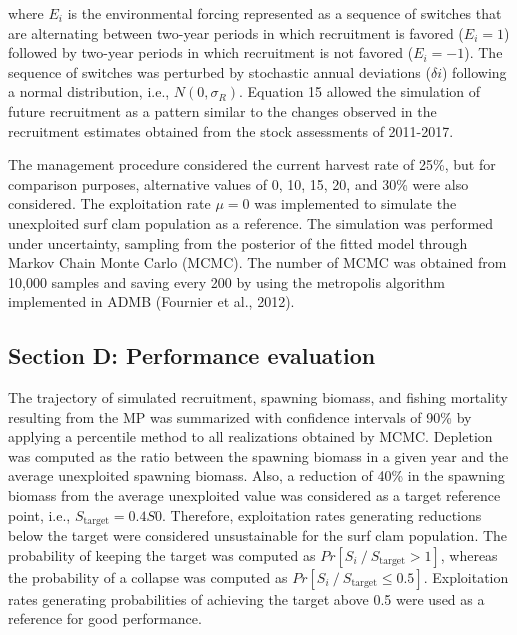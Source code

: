 \documentclass[12pt]{article}
\begin{document}
where \(E_i\) is the environmental forcing represented as a sequence of
switches that are alternating between two-year periods in which
recruitment is favored (\(E_i = 1\)) followed by two-year periods in
which recruitment is not favored (\(E_i = -1\)). The sequence of
switches was perturbed by stochastic annual deviations (\(\delta i\))
following a normal distribution, i.e., \(N(0,\sigma_R)\). Equation 15
allowed the simulation of future recruitment as a pattern similar to the
changes observed in the recruitment estimates obtained from the stock
assessments of 2011-2017.

The management procedure considered the current harvest rate of 25\%,
but for comparison purposes, alternative values of 0, 10, 15, 20, and
30\% were also considered. The exploitation rate \(\mu=0\) was
implemented to simulate the unexploited surf clam population as a
reference. The simulation was performed under uncertainty, sampling from
the posterior of the fitted model through Markov Chain Monte Carlo
(MCMC). The number of MCMC was obtained from 10,000 samples and saving
every 200 by using the metropolis algorithm implemented in ADMB
(Fournier et al., 2012).

\hypertarget{section-d-performance-evaluation}{%
\subsection{Section D: Performance
evaluation}\label{section-d-performance-evaluation}}

The trajectory of simulated recruitment, spawning biomass, and fishing
mortality resulting from the MP was summarized with confidence intervals
of 90\% by applying a percentile method to all realizations obtained by
MCMC. Depletion was computed as the ratio between the spawning biomass
in a given year and the average unexploited spawning biomass. Also, a
reduction of 40\% in the spawning biomass from the average unexploited
value was considered as a target reference point, i.e.,
\(S_{\text{target}} = 0.4S0\). Therefore, exploitation rates generating
reductions below the target were considered unsustainable for the surf
clam population. The probability of keeping the target was computed as
\(Pr[S_i⁄S_{\text{target}} > 1]\), whereas the probability of a collapse
was computed as \(Pr[S_i⁄S_{\text{target}} \leq 0.5]\). Exploitation
rates generating probabilities of achieving the target above 0.5 were
used as a reference for good performance.

\FloatBarrier
\end{document}
